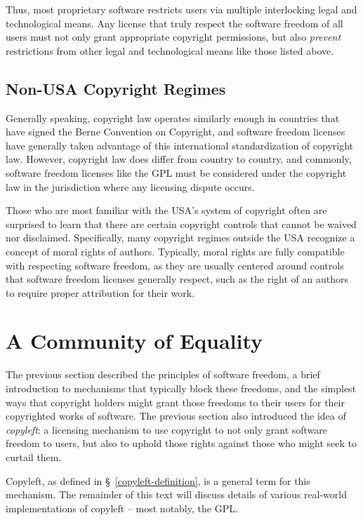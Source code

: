 Thus, most proprietary software restricts users via multiple interlocking
legal and technological means.  Any license that truly respect the software
freedom of all users must not only grant appropriate copyright permissions,
but also \textit{prevent} restrictions from other legal and technological
means like those listed above.

\subsection{Non-USA Copyright Regimes}
\label{non-usa-copyright}

Generally speaking, copyright law operates similarly enough in countries that
have signed the Berne Convention on Copyright, and software freedom licenses
have generally taken advantage of this international standardization of
copyright law.  However, copyright law does differ from country to country,
and commonly, software freedom licenses like the GPL must be considered under the
copyright law in the jurisdiction where any licensing dispute occurs.

Those who are most familiar with the USA's system of copyright often are
surprised to learn that there are certain copyright controls that cannot be
waived nor disclaimed.  Specifically, many copyright regimes outside the USA
recognize a concept of moral rights of authors.  Typically, moral rights are
fully compatible with respecting software freedom, as they are usually
centered around controls that software freedom licenses generally respect,
such as the right of an authors to require proper attribution for their work.

\section{A Community of Equality}

The previous section described the principles of software freedom, a brief
introduction to mechanisms that typically block these freedoms, and the
simplest ways that copyright holders might grant those freedoms to their
users for their copyrighted works of software.  The previous section also
introduced the idea of \textit{copyleft}: a licensing mechanism to use
copyright to not only grant software freedom to users, but also to uphold
those rights against those who might seek to curtail them.

Copyleft, as defined in \S~\ref{copyleft-definition}, is a general term for this
mechanism.  The remainder of this text will discuss details of various
real-world implementations of copyleft -- most notably, the GPL\@.

